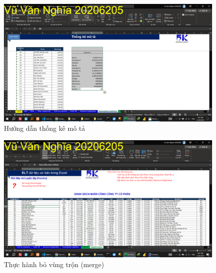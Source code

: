 \documentclass{article}
\begin{document}
\begin{figure}[h]
    \centering
    \includegraphics[scale = 0.15]{Video1/HuongDan/13.png}
    \caption{Hướng dẫn thống kê mô tả}
\end{figure}

\begin{figure}[h]
    \centering
    \includegraphics[scale = 0.15]{Video1/ThucHanh/1.png}
    \caption{Thực hành bỏ vùng trộn (merge)}
\end{figure}
\end{document}
